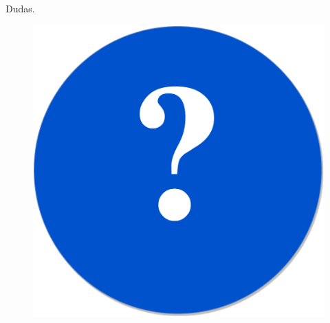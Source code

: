 \appendix
\begin{frame}{Dudas}{\textcolor{UniBlue}{.}}
\begin{figure}
  \center
    \includegraphics[scale=0.25]{images/Questions.pdf}
\end{figure}
\end{frame}